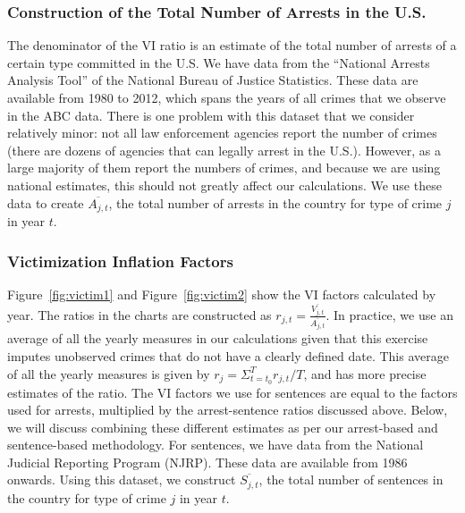 \subsubsection{Construction of the Total Number of Arrests in the U.S.}
\noindent The denominator of the VI ratio is an estimate of the total number of arrests of a certain type committed in the U.S. We have data from the ``National Arrests Analysis Tool'' of the National Bureau of Justice Statistics. These data are available from 1980 to 2012, which spans the years of all crimes that we observe in the ABC data. There is one problem with this dataset that we consider relatively minor: not all law enforcement agencies report the number of crimes (there are dozens of agencies that can legally arrest in the U.S.). However, as a large majority of them report the numbers of crimes, and because we are using national estimates, this should not greatly affect our calculations. We use these data to create $\overline{A_{j,t}}$, the total number of arrests in the country for type of crime $j$ in year $t$. 

\subsubsection{Victimization Inflation Factors}

\noindent Figure~\ref{fig:victim1} and Figure~\ref{fig:victim2} show the VI factors calculated by year. The ratios in the charts are constructed as $r_{j,t}=\frac{\overline{V_{j,t}}}{\overline{A_{j,t}}}$. In practice, we use an average of all the yearly measures in our calculations given that this exercise imputes unobserved crimes that do not have a clearly defined date. This average of all the yearly measures is given by $r_j=\Sigma_{t=t_0}^{T}r_{j,t}/T$, and has more precise estimates of the ratio. The VI factors we use for sentences are equal to the factors used for arrests, multiplied by the arrest-sentence ratios discussed above. Below, we will discuss combining these different estimates as per our arrest-based and sentence-based methodology. For sentences, we have data from the National Judicial Reporting Program (NJRP). These data are available from 1986 onwards. Using this dataset, we construct $\overline{S_{j,t}}$, the total number of sentences in the country for type of crime $j$ in year $t$. 

